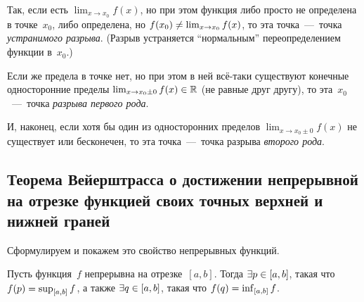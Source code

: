 \documentclass[a4paper,12pt]{article}
\begin{document}
  
  Так, если есть $\lim_{x \to x_0} f(x)$, но при этом функция либо просто не определена в точке~$x_0$, либо определена, но $f(x_0) \hm{\not=} \lim_{x \to x_0} f(x)$, то эта точка~---~точка \emph{устранимого разрыва}.
  (Разрыв устраняется ``нормальным'' переопределением функции в~$x_0$.)

  Если же предела в точке нет, но при этом в ней всё-таки существуют конечные односторонние пределы $\lim_{x \to x_0 \pm 0} f(x) \hm\in \RR$ (не равные друг другу), то эта~$x_0$~---~точка \emph{разрыва первого рода}.

  И, наконец, если хотя бы один из односторонних пределов $\lim_{x \to x_0 \pm 0} f(x)$ не существует или бесконечен, то эта точка~---~точка разрыва \emph{второго рода}.


  \subsection{Теорема Вейерштрасса о достижении непрерывной на отрезке функцией своих точных верхней и нижней граней}

  Сформулируем и покажем это свойство непрерывных функций.

  \begin{proposition}
      Пусть функция~$f$ непрерывна на отрезке~$[a, b]$.
      Тогда $\exists p \hm\in [a, b]$, такая что $f(p) \hm= \sup_{[a, b]} f$, а также $\exists q \hm\in [a, b]$, такая что $f(q) \hm= \inf_{[a, b]} f$.
  \end{proposition}
\end{document}
